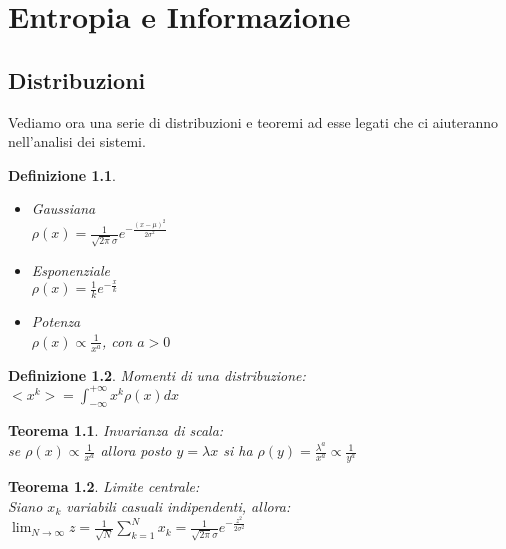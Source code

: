 \documentclass[12pt, a4paper]{book}
\theoremstyle{theorem}
\newtheorem{definition}{Definizione}[section]
\newtheorem{theorem}{Teorema}[section]
\begin{document}
	\chapter{Entropia e Informazione} %
		\section{Distribuzioni}
		Vediamo ora una serie di distribuzioni e teoremi ad esse legati che ci aiuteranno nell'analisi dei sistemi.
		\begin{definition}\hfill
			\begin{itemize}
				\item Gaussiana\\	$\rho(x)=\frac{1}{\sqrt{2\pi}\sigma}e^{-\frac{(x-\mu)^2}{2\sigma^2}}$
				\item Esponenziale\\	$\rho(x)=\frac{1}{k}e^{-\frac{x}{k}}$
				\item Potenza\\		$\rho(x)\propto\frac{1}{x^a}$, con $a>0$
			\end{itemize}
		\end{definition}
		\begin{definition}
			Momenti di una distribuzione:\\
			$<x^k>=\int_{-\infty}^{+\infty}x^k\rho(x)dx$
		\end{definition}
		\begin{theorem}
			Invarianza di scala:\\
			se $\rho(x)\propto\frac{1}{x^a}$ allora posto $y=\lambda x$ si ha $\rho(y)=\frac{\lambda^a}{x^a}\propto\frac{1}{y^a}$
		\end{theorem}
		\begin{theorem}
			Limite centrale:\\
			Siano ${x_k}$ variabili casuali indipendenti, allora:\\
			$\lim_{N\to\infty}z=\frac{1}{\sqrt{N}}\sum_{k=1}^{N}x_k=\frac{1}{\sqrt{2\pi}\sigma}e^{-\frac{z^2}{2\sigma^2}}$
		\end{theorem}
		
\end{document}
